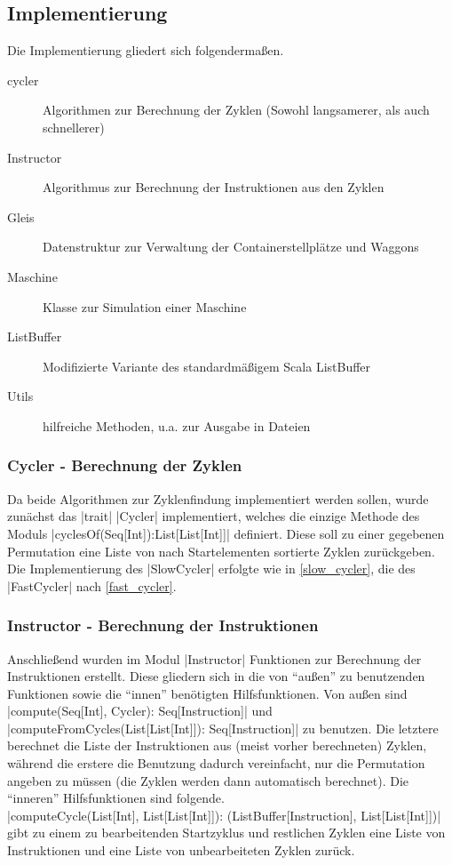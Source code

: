 \subsection{Implementierung}
Die Implementierung gliedert sich folgendermaßen.
\begin{description}
 \item[cycler] Algorithmen zur Berechnung der Zyklen (Sowohl langsamerer, als auch schnellerer)
 \item[Instructor] Algorithmus zur Berechnung der Instruktionen aus den Zyklen
 \item[Gleis] Datenstruktur zur Verwaltung der Containerstellplätze und Waggons
 \item[Maschine] Klasse zur Simulation einer Maschine
 \item[ListBuffer] Modifizierte Variante des standardmäßigem Scala ListBuffer
 \item[Utils] hilfreiche Methoden, u.a. zur Ausgabe in Dateien
\end{description}

\subsubsection{Cycler - Berechnung der Zyklen}
Da beide Algorithmen zur Zyklenfindung implementiert werden sollen, wurde zunächst das |trait| |Cycler| implementiert,
welches die einzige Methode des Moduls |cyclesOf(Seq[Int]):List[List[Int]]| definiert.
Diese soll zu einer gegebenen Permutation eine Liste von nach Startelementen sortierte Zyklen zurückgeben. \\
Die Implementierung des |SlowCycler| erfolgte wie in \ref{slow_cycler}, die des |FastCycler| nach \ref{fast_cycler}.

\subsubsection{Instructor - Berechnung der Instruktionen}
Anschließend wurden im Modul |Instructor| Funktionen zur Berechnung der Instruktionen erstellt.
Diese gliedern sich in die von ``außen'' zu benutzenden Funktionen sowie die ``innen'' benötigten Hilfsfunktionen.
Von außen sind |compute(Seq[Int], Cycler): Seq[Instruction]| und |computeFromCycles(List[List[Int]]): Seq[Instruction]| zu benutzen.
Die letztere berechnet die Liste der Instruktionen aus (meist vorher berechneten) Zyklen,
während die erstere die Benutzung dadurch vereinfacht, nur die Permutation angeben zu müssen (die Zyklen werden dann automatisch berechnet).
Die ``inneren'' Hilfsfunktionen sind folgende. \\
|computeCycle(List[Int], List[List[Int]]): (ListBuffer[Instruction], List[List[Int]])|
gibt zu einem zu bearbeitenden Startzyklus und restlichen Zyklen eine Liste von Instruktionen und eine Liste von unbearbeiteten Zyklen zurück.

